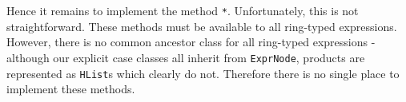 Hence it remains to implement the method \lstinline{*}. Unfortunately, this is not straightforward. These methods must be available to all ring-typed expressions. However, there is no common ancestor class for all ring-typed expressions - although our explicit case classes all inherit from \lstinline{ExprNode}, products are represented as \lstinline{HList}s which clearly do not. Therefore there is no single place to implement these methods. 
